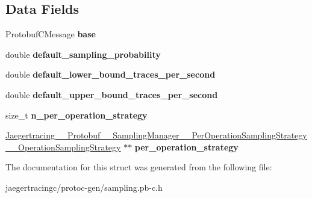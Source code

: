 \subsection*{Data Fields}
\begin{DoxyCompactItemize}
\item 
\mbox{\label{struct__Jaegertracing____Protobuf____SamplingManager____PerOperationSamplingStrategy_a68a1b18890023153e365d9fb9eecfac7}} 
Protobuf\+C\+Message {\bfseries base}
\item 
\mbox{\label{struct__Jaegertracing____Protobuf____SamplingManager____PerOperationSamplingStrategy_a99f02545f9bf9397a1d45da4d810f265}} 
double {\bfseries default\+\_\+sampling\+\_\+probability}
\item 
\mbox{\label{struct__Jaegertracing____Protobuf____SamplingManager____PerOperationSamplingStrategy_a0f03dcadd349c4b1005b55837c518580}} 
double {\bfseries default\+\_\+lower\+\_\+bound\+\_\+traces\+\_\+per\+\_\+second}
\item 
\mbox{\label{struct__Jaegertracing____Protobuf____SamplingManager____PerOperationSamplingStrategy_a8aa2f4f89992ebafb082ee6b6fd8ecff}} 
double {\bfseries default\+\_\+upper\+\_\+bound\+\_\+traces\+\_\+per\+\_\+second}
\item 
\mbox{\label{struct__Jaegertracing____Protobuf____SamplingManager____PerOperationSamplingStrategy_a636b2d5dad99a8dc1e67a310c240023a}} 
size\+\_\+t {\bfseries n\+\_\+per\+\_\+operation\+\_\+strategy}
\item 
\mbox{\label{struct__Jaegertracing____Protobuf____SamplingManager____PerOperationSamplingStrategy_a64bd6d5d797c89d3f700d8c4a6914901}} 
\mbox{\hyperlink{struct__Jaegertracing____Protobuf____SamplingManager____PerOperationSamplingStrategy____OperationSamplingStrategy}{Jaegertracing\+\_\+\+\_\+\+Protobuf\+\_\+\+\_\+\+Sampling\+Manager\+\_\+\+\_\+\+Per\+Operation\+Sampling\+Strategy\+\_\+\+\_\+\+Operation\+Sampling\+Strategy}} $\ast$$\ast$ {\bfseries per\+\_\+operation\+\_\+strategy}
\end{DoxyCompactItemize}


The documentation for this struct was generated from the following file\+:\begin{DoxyCompactItemize}
\item 
jaegertracingc/protoc-\/gen/sampling.\+pb-\/c.\+h\end{DoxyCompactItemize}
